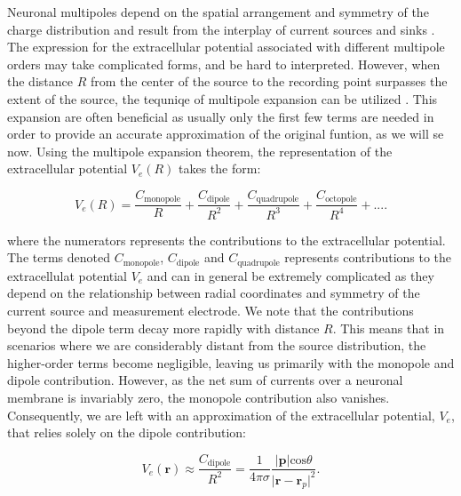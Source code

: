 \documentclass[a4paper, UKenglish, 11pt]{uiomaster}
\begin{document}
Neuronal multipoles depend on the spatial arrangement and symmetry of the charge distribution and result from the interplay of current sources and sinks \cite{wiki:multipoles}. The expression for the extracellular potential associated with different multipole orders may take complicated forms, and be hard to interpreted. However, when the distance $R$ from the center of the source to the recording point surpasses the extent of the source, the tequniqe of multipole expansion can be utilized \cite{jackson1999classical}. This expansion are often beneficial as usually only the first few terms are needed in order to provide an accurate approximation of the original funtion, as we will se now. Using the multipole expansion theorem, the representation of the extracellular potential $V_e(R)$ takes the form:

\begin{equation}
  V_e(R) = \frac{C_{\text{monopole}}}{R} + \frac{C_{\text{dipole}}}{R^2} + \frac{C_{\text{quadrupole}}}{R^3} + \frac{C_{\text{octopole}}}{R^4} + ... .
\label{eq:extracellular_potential}
\end{equation}

where the numerators represents the contributions to the extracellular potential. The terms denoted $C_\text{monopole}$, $C_\text{dipole}$ and $C_\text{quadrupole}$ represents contributions to the extracellulat potential $V_e$ and can in general be extremely complicated as they depend on the relationship between radial coordinates and symmetry of the current source and measurement electrode. We note that the contributions beyond the dipole term decay more rapidly with distance $R$. This means that in scenarios where we are considerably distant from the source distribution, the higher-order terms become negligible, leaving us primarily with the monopole and dipole contribution. However, as the net sum of currents over a neuronal membrane is invariably zero, the monopole contribution also vanishes. Consequently, we are left with an approximation of the extracellular potential, $V_e$, that relies solely on the dipole contribution:

\begin{equation}
V_e(\textbf{r}) \approx \frac{C_{\text{dipole}}}{R^2} = \frac{1}{4\pi\sigma}\frac{|\textbf{p}| \text{cos} \theta}{\lvert\textbf{r}-\textbf{r}_p\rvert^2}.
\label{eq:extracellular_potential_approximation}
\end{equation}
\end{document}
